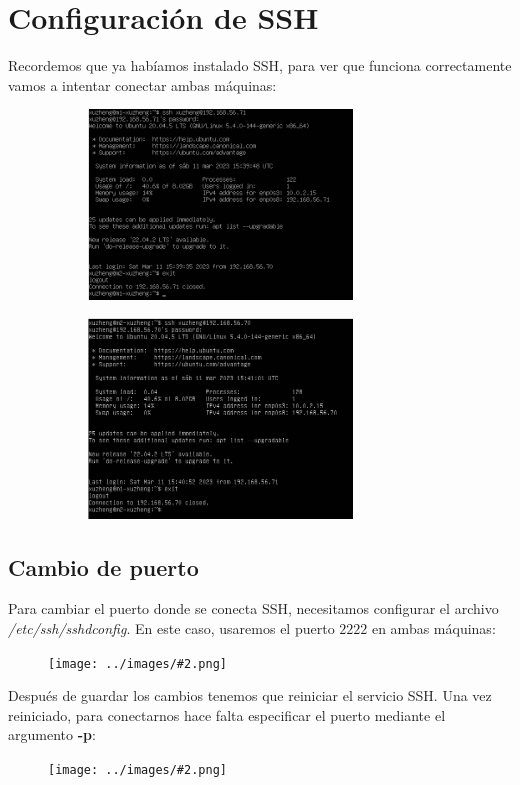 \documentclass[twoside]{article}
\newcommand{\image}[2]{
\begin{figure}[H]
    \texttt{[image: ../images/\#2.png]}
    \centering
\end{figure}
}
\begin{document}
\section{Configuración de SSH}
Recordemos que ya habíamos instalado SSH, para ver que funciona correctamente vamos a intentar conectar ambas máquinas:
\begin{figure}[H]
    \centering
    \begin{subfigure}{.5\textwidth}
        \centering
        \includegraphics[width=7cm]{../images/32.png}
    \end{subfigure}%
    \begin{subfigure}{.5\textwidth}
        \centering
        \includegraphics[width=7cm]{../images/33.png}
    \end{subfigure}
\end{figure}
\subsection{Cambio de puerto}
Para cambiar el puerto donde se conecta SSH, necesitamos configurar el archivo \textit{/etc/ssh/sshd\textunderscore config}. En este caso, usaremos el puerto $2222$ en ambas máquinas:
\image{8}{34}
Después de guardar los cambios tenemos que reiniciar el servicio SSH. Una vez reiniciado, para conectarnos hace falta especificar el puerto mediante el argumento \textbf{-p}:
\image{8}{35}
\end{document}
